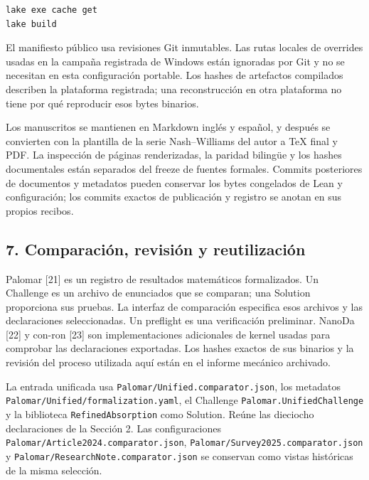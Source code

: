 \documentclass[spanish,11pt,a4paper]{article}
\begin{document}
\begin{verbatim}
lake exe cache get
lake build
\end{verbatim}

El manifiesto público usa revisiones Git inmutables. Las rutas locales de overrides usadas en la campaña registrada de Windows están ignoradas por Git y no se necesitan en esta configuración portable. Los hashes de artefactos compilados describen la plataforma registrada; una reconstrucción en otra plataforma no tiene por qué reproducir esos bytes binarios.

Los manuscritos se mantienen en Markdown inglés y español, y después se convierten con la plantilla de la serie Nash--Williams del autor a TeX final y PDF. La inspección de páginas renderizadas, la paridad bilingüe y los hashes documentales están separados del freeze de fuentes formales. Commits posteriores de documentos y metadatos pueden conservar los bytes congelados de Lean y configuración; los commits exactos de publicación y registro se anotan en sus propios recibos.

\subsection{7. Comparación, revisión y reutilización}\label{comparaciuxf3n-revisiuxf3n-y-reutilizaciuxf3n}

Palomar {[}21{]} es un registro de resultados matemáticos formalizados. Un Challenge es un archivo de enunciados que se comparan; una Solution proporciona sus pruebas. La interfaz de comparación especifica esos archivos y las declaraciones seleccionadas. Un preflight es una verificación preliminar. NanoDa {[}22{]} y con-ron {[}23{]} son implementaciones adicionales de kernel usadas para comprobar las declaraciones exportadas. Los hashes exactos de sus binarios y la revisión del proceso utilizada aquí están en el informe mecánico archivado.

La entrada unificada usa \texttt{Palomar/\allowbreak{}Unified.\allowbreak{}comparator.\allowbreak{}json}, los metadatos \texttt{Palomar/\allowbreak{}Unified/\allowbreak{}formalization.\allowbreak{}yaml}, el Challenge \texttt{Palomar.\allowbreak{}Unified\allowbreak{}Challenge} y la biblioteca \texttt{Refined\allowbreak{}Absorption} como Solution. Reúne las dieciocho declaraciones de la Sección 2. Las configuraciones \texttt{Palomar/\allowbreak{}Article2024.\allowbreak{}comparator.\allowbreak{}json}, \texttt{Palomar/\allowbreak{}Survey2025.\allowbreak{}comparator.\allowbreak{}json} y \texttt{Palomar/\allowbreak{}Research\allowbreak{}Note.\allowbreak{}comparator.\allowbreak{}json} se conservan como vistas históricas de la misma selección.
\end{document}
